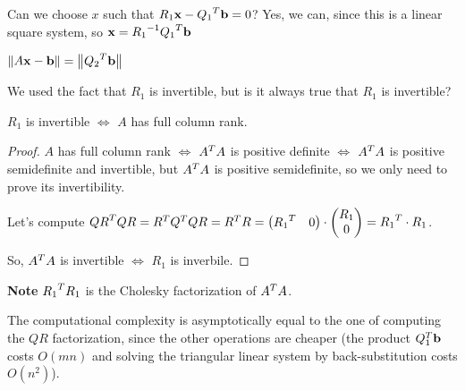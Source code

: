\documentclass[computationalMathematics.tex]{subfiles}
\begin{document}
Can we choose $x$ such that $R_{1} \mathbf{x} - {Q_{1}}^{T} \mathbf{b} = 0$? Yes, we can, since this is a linear square system, so $\mathbf{x} = {R_{1}}^{-1} {Q_{1}}^{T} \mathbf{b} $

$\left\lVert A\mathbf{x} - \mathbf{b}\right\rVert = \left\lVert{Q_{2}}^{T} \mathbf{b}\right\rVert$


We used the fact that $R_{1}$ is invertible, but is it always true that $R_{1}$ is invertible?

\begin{lemma}
  $R_{1}$ is invertible $\Leftrightarrow$ $A$ has full column rank.
\end{lemma}

\begin{proof}
  $A$ has full column rank $\Leftrightarrow$ ${A}^{T}A$ is positive definite $\Leftrightarrow$ ${A}^{T}A$ is positive semidefinite and invertible, but ${A}^{T}A$ is positive semidefinite, so we only need to prove its invertibility.
  
  Let's compute ${QR}^{T} QR = {R}^{T} {Q}^{T} Q R = {R}^{T} R = \begin{pmatrix} {R_{1}}^{T} & 0 \end{pmatrix} \cdot \begin{pmatrix} R_{1}\\ 0 \end{pmatrix} = {R_{1}}^{T} \cdot R_1$.
    
    So, ${A}^{T}A$ is invertible $\Leftrightarrow$ $R_1$ is inverbile.
\end{proof}

\begin{myframe}{\bf Note}
${R_{1}}^{T}R_{1}$ is the Cholesky factorization of ${A}^{T}A$.
\end{myframe}

The computational complexity is asymptotically equal to the one of computing the $QR$ factorization, since the other operations are cheaper (the product $Q_1^T\mathbf{b}$ costs $O(mn)$ and solving the triangular linear system by back-substitution costs $O(n^2)$).
\end{document}
